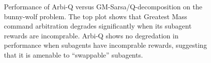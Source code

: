 \begin{figure}[ht]
  \begin{center}
    \caption{Performance of Arbi-Q versus GM-Sarsa/Q-decomposition on the bunny-wolf problem. The top plot shows that Greatest Mass command arbitration degrades significantly when its subagent rewards are incomprable. Arbi-Q shows no degredation in performance when subagents have incomprable rewards, suggesting that it is amenable to ``swappable'' subagents.}
  \end{center}
  \label{fig:gmresults}
\end{figure}


